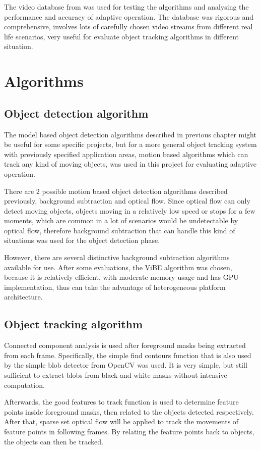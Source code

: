 The video database from \cite{goyette2012changedetection} was used for testing the algorithms and analysing the performance and accuracy of adaptive operation. The database was rigorous and comprehensive, involves lots of carefully chosen video streams from different real life scenarios, very useful for evaluate object tracking algorithms in different situation.

\section{Algorithms}

\subsection{Object detection algorithm}

The model based object detection algorithms described in previous chapter might be useful for some specific projects, but for a more general object tracking system with previously specified application areas, motion based algorithms which can track any kind of moving objects, was used in this project for evaluating adaptive operation.

There are 2 possible motion based object detection algorithms described previously, background subtraction and optical flow. Since optical flow can only detect moving objects, objects moving in a relatively low speed or stops for a few moments, which are common in a lot of scenarios would be undetectable by optical flow, therefore background subtraction that can handle this kind of situations was used for the object detection phase.

However, there are several distinctive background subtraction algorithms available for use. After some evaluations, the ViBE algorithm was chosen, because it is relatively efficient, with moderate memory usage and has GPU implementation, thus can take the advantage of heterogeneous platform architecture.

\subsection{Object tracking algorithm}

Connected component analysis is used after foreground masks being extracted from each frame. Specifically, the simple find contours function that is also used by the simple blob detector from OpenCV was used. It is very simple, but still sufficient to extract blobs from black and white masks without intensive computation.

Afterwards, the good features to track function is used to determine feature points inside foreground masks, then related to the objects detected respectively. After that, sparse set optical flow will be applied to track the movements of feature points in following frames. By relating the feature points back to objects, the objects can then be tracked.

